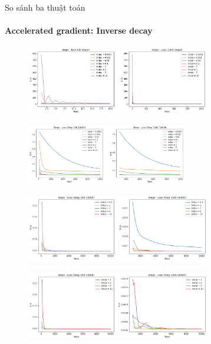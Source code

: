 \documentclass[10pt]{beamer}
\theoremstyle{remark}
\theoremstyle{definition}
\begin{document}
\begin{frame}[allowframebreaks]{So sánh ba thuật toán}
	\framesubtitle{Accelerated gradient: Inverse decay}
	\begin{figure}
		\centering
		\includegraphics[width=8cm]{Thinh/19.png}
	\end{figure}

	\begin{figure}
		\centering
		\includegraphics[width=7cm]{Thinh/20.png}
	\end{figure}

	\begin{figure}
		\centering
		\includegraphics[width=8cm]{Thinh/21.png}
	\end{figure}

	\begin{figure}
		\centering
		\includegraphics[width=8cm]{Thinh/22.png}
	\end{figure}
\end{frame}
\end{document}
